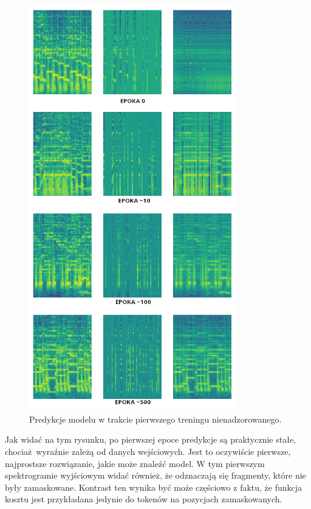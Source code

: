 \begin{figure}
    \centering
    \includegraphics[width=0.8\textwidth]{./images/mae1_predictions.png}
    \caption{Predykcje modelu w trakcie pierwszego treningu nienadzorowanego.}
    \label{fig:mae1_predictions}
\end{figure}

Jak widać na tym rysunku, po pierwszej epoce predykcje są praktycznie stałe, chociaż wyraźnie zależą od danych wejściowych. Jest to oczywiście pierwsze, najprostsze rozwiązanie, jakie może znaleźć model. W tym pierwszym spektrogramie wyjściowym widać również, że odznaczają się fragmenty, które nie były zamaskowane. Kontrast ten wynika być może częściowo z faktu, że funkcja kosztu jest przykładana jedynie do tokenów na pozycjach zamaskowanych.

